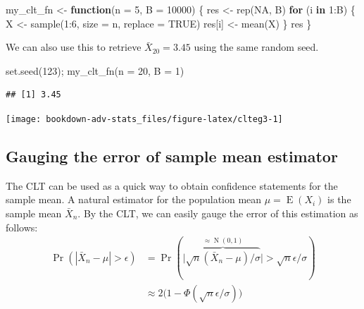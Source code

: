 \documentclass[
]{book}
\newenvironment{Shaded}{\begin{snugshade}}{\end{snugshade}}
\newcommand{\AttributeTok}[1]{\textcolor[rgb]{0.77,0.63,0.00}{#1}}
\newcommand{\ConstantTok}[1]{\textcolor[rgb]{0.00,0.00,0.00}{#1}}
\newcommand{\ControlFlowTok}[1]{\textcolor[rgb]{0.13,0.29,0.53}{\textbf{#1}}}
\newcommand{\DecValTok}[1]{\textcolor[rgb]{0.00,0.00,0.81}{#1}}
\newcommand{\FunctionTok}[1]{\textcolor[rgb]{0.00,0.00,0.00}{#1}}
\newcommand{\NormalTok}[1]{#1}
\newcommand{\OtherTok}[1]{\textcolor[rgb]{0.56,0.35,0.01}{#1}}
\newcommand{\SpecialCharTok}[1]{\textcolor[rgb]{0.00,0.00,0.00}{#1}}
\DeclareMathOperator{\E}{E}
\DeclareMathOperator{\N}{N}
\theoremstyle{definition}
\theoremstyle{definition}
\theoremstyle{definition}
\theoremstyle{definition}
\theoremstyle{remark}
\begin{document}
\begin{Shaded}
\begin{Highlighting}[]
\NormalTok{my\_clt\_fn }\OtherTok{\textless{}{-}} \ControlFlowTok{function}\NormalTok{(}\AttributeTok{n =} \DecValTok{5}\NormalTok{, }\AttributeTok{B =} \DecValTok{10000}\NormalTok{) \{}
\NormalTok{  res }\OtherTok{\textless{}{-}} \FunctionTok{rep}\NormalTok{(}\ConstantTok{NA}\NormalTok{, B)}
  \ControlFlowTok{for}\NormalTok{ (i }\ControlFlowTok{in} \DecValTok{1}\SpecialCharTok{:}\NormalTok{B) \{}
\NormalTok{    X }\OtherTok{\textless{}{-}} \FunctionTok{sample}\NormalTok{(}\DecValTok{1}\SpecialCharTok{:}\DecValTok{6}\NormalTok{, }\AttributeTok{size =}\NormalTok{ n, }\AttributeTok{replace =} \ConstantTok{TRUE}\NormalTok{)}
\NormalTok{    res[i] }\OtherTok{\textless{}{-}} \FunctionTok{mean}\NormalTok{(X)}
\NormalTok{  \}}
\NormalTok{  res}
\NormalTok{\}}
\end{Highlighting}
\end{Shaded}

We can also use this to retrieve \(\bar X_{20}=3.45\) using the same random seed.

\begin{Shaded}
\begin{Highlighting}[]
\FunctionTok{set.seed}\NormalTok{(}\DecValTok{123}\NormalTok{); }\FunctionTok{my\_clt\_fn}\NormalTok{(}\AttributeTok{n =} \DecValTok{20}\NormalTok{, }\AttributeTok{B =} \DecValTok{1}\NormalTok{)}
\end{Highlighting}
\end{Shaded}

\begin{verbatim}
## [1] 3.45
\end{verbatim}

\begin{center}\texttt{[image: bookdown-adv-stats\_files/figure-latex/clteg3-1]} \end{center}

\hypertarget{gauging-the-error-of-sample-mean-estimator}{%
\subsection{Gauging the error of sample mean estimator}\label{gauging-the-error-of-sample-mean-estimator}}

The CLT can be used as a quick way to obtain confidence statements for the sample mean.
A natural estimator for the population mean \(\mu=\E(X_i)\) is the sample mean \(\bar X_n\).
By the CLT, we can easily gauge the error of this estimation as follows:
\[\begin{aligned}
    \Pr(|\bar X_n-\mu| > \epsilon)
    &= \Pr(\big|\overbrace{\sqrt{n}(\bar X_n - \mu)/\sigma}^{\approx\N(0,1)} \big| > \sqrt{n}\epsilon/\sigma) \\
    &\approx 2\big(1-\Phi(\sqrt{n}\epsilon/\sigma)\big)
  \end{aligned}\]
\end{document}
